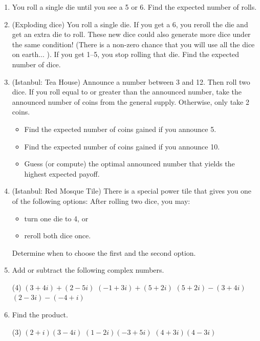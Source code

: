 \begin{enumerate}
\item You roll a single die until you see a 5 or 6. Find the expected number of rolls.
\vspace{40pt}

\item (Exploding dice) You roll a single die. If you get a 6, you reroll the die and get an extra die to roll. These new dice could also generate more dice under the same condition! (There is a non-zero chance that you will use all the dice on earth... ). If you get 1--5, you stop rolling that die. Find the expected number of dice.
\vspace{40pt}

\item (Istanbul: Tea House) Announce a number between 3 and 12. Then roll two dice. If you roll equal to or greater than the announced number, take the announced number of coins from the general supply. Otherwise, only take 2 coins.

\begin{itemize}
\item Find the expected number of coins gained if you announce 5.
\item Find the expected number of coins gained if you announce 10.
\item Guess (or compute) the optimal announced number that yields the highest expected payoff.
\end{itemize}
\vspace{40pt}

\item (Istanbul: Red Mosque Tile) There is a special power tile that gives you one of the following options: After rolling two dice, you may:
\begin{itemize} 
\item turn one die to 4, or
\item reroll both dice once.
\end{itemize}
Determine when to choose the first and the second option.

\newpage

\item Add or subtract the following complex numbers.
\begin{tasks}[after-skip=20pt, after-item-skip=15pt](4)
\task $(3 + 4i) + (2 - 5i)$
\task $(-1 + 3i) + (5 + 2i)$
\task $(5 + 2i) - (3 + 4i)$
\task $(2 - 3i) - (-4 + i)$
\end{tasks}


\item Find the product.
\begin{tasks}[after-skip=25pt](3)
\task $(2 + i)(3 - 4i)$
\task $(1 - 2i)(-3 + 5i)$
\task $(4 + 3i)(4 - 3i)$
\end{tasks}


\end{enumerate}
